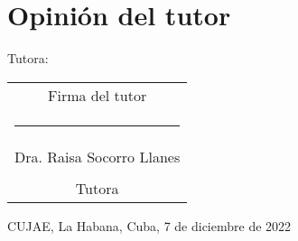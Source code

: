 \chapter*{Opinión del tutor}


\vspace{1.5cm}

Tutora:

\vspace{1.5cm}
\begingroup	
\setlength{\tabcolsep}{10pt} %
\renewcommand{\arraystretch}{0.5} %

\begin{tabular}{c}
	Firma del tutor  \\
	\noindent\rule{6cm}{0.4pt}\\
	Dra. Raisa Socorro Llanes \\
	\\
	Tutora 
\end{tabular}
\endgroup

\vspace{1.5cm}
CUJAE, La Habana, Cuba, 7 de diciembre de 2022